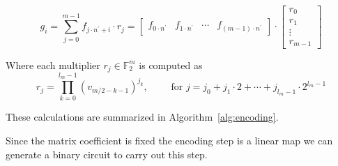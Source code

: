         \begin{equation*}
            g_i = \sum_{j=0}^{m-1} f_{j\cdot n^\prime +i}\cdot r_j = \begin{bmatrix} f_{0\cdot n^\prime} & f_{1\cdot n^\prime} & \cdots &f_{(m-1)\cdot n^\prime}\end{bmatrix} \cdot \begin{bmatrix}

                r_0 \\
                r_1 \\
                \vdots \\
                r_{m-1}
            \end{bmatrix}
        \end{equation*}

        Where each multiplier $r_j \in \mathds{F}_2^m$ is computed as
        \begin{equation*}
            r_j = \prod_{k=0}^{l_m-1} (v_{m/2 - k - 1})^{j_k}, \qquad \text{ for } j = j_0+ j_1\cdot 2 + \cdots + j_{l_m-1}\cdot 2^{l_m-1}
        \end{equation*}
        
        These calculations are summarized in Algorithm~\ref{alg:encoding}.

    \begin{algorithm2e}[H]
        \caption{Encoding, as a vector-matrix product}
        \label{alg:encoding}
        
    \end{algorithm2e}
        Since the matrix coefficient is fixed the encoding step is a linear map we can generate a binary circuit
        to carry out this step.
